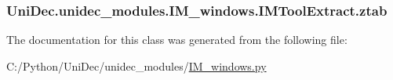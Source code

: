 \subsubsection[{ztab}]{\setlength{\rightskip}{0pt plus 5cm}Uni\+Dec.\+unidec\+\_\+modules.\+I\+M\+\_\+windows.\+I\+M\+Tool\+Extract.\+ztab}\label{class_uni_dec_1_1unidec__modules_1_1_i_m__windows_1_1_i_m_tool_extract_a46ce7ccc7118c7baf8441fc3d5b8f321}


The documentation for this class was generated from the following file\+:\begin{DoxyCompactItemize}
\item 
C\+:/\+Python/\+Uni\+Dec/unidec\+\_\+modules/\hyperlink{_i_m__windows_8py}{I\+M\+\_\+windows.\+py}\end{DoxyCompactItemize}
